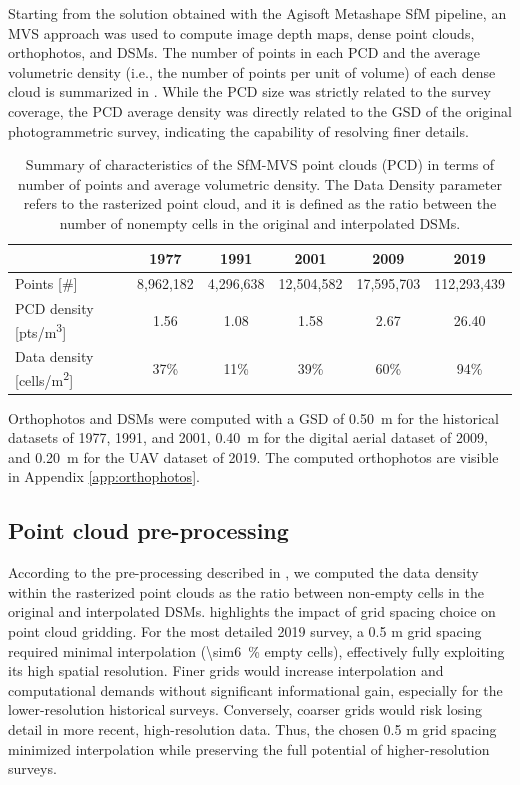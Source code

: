 Starting from the solution obtained with the Agisoft Metashape SfM pipeline, an MVS approach was used to compute image depth maps, dense point clouds, orthophotos, and DSMs. 
The number of points in each PCD and the average volumetric density (i.e., the number of points per unit of volume) of each dense cloud is summarized in .
While the PCD size was strictly related to the survey coverage, the PCD average density was directly related to the GSD of the original photogrammetric survey, indicating the capability of resolving finer details.

\begin{table}
    \centering
    \caption{Summary of characteristics of the SfM-MVS point clouds (PCD) in terms of number of points and average volumetric density. 
    The Data Density parameter refers to the rasterized point cloud, and it is defined as the ratio between the number of nonempty cells in the original and interpolated DSMs.}
    \label{tab:2:pcd_stats}
    \begin{tabular}{lccccc}
        \hline
        & 1977 & 1991 & 2001 & 2009 & 2019 \\
        \hline
        Points [\#] & 8,962,182 & 4,296,638 & 12,504,582 & 17,595,703 & 112,293,439 \\
        PCD density [pts/m\textsuperscript{3}] & 1.56 & 1.08 & 1.58 & 2.67 & 26.40 \\
        Data density [cells/m\textsuperscript{2}] & 37\% & 11\% & 39\% & 60\% & 94\% \\
        \hline
    \end{tabular}
\end{table}

Orthophotos and DSMs were computed with a GSD of \SI{0.50}{\meter} for the historical datasets of 1977, 1991, and 2001, \SI{0.40}{\meter} for the digital aerial dataset of 2009, and \SI{0.20}{\meter} for the UAV dataset of 2019.
The computed orthophotos are visible in Appendix \ref{app:orthophotos}.

\subsection{Point cloud pre-processing}\label{sec:2:res_preproc}

According to the pre-processing described in , we computed the data density within the rasterized point clouds as the ratio between non-empty cells in the original and interpolated DSMs.
 highlights the impact of grid spacing choice on point cloud gridding. 
For the most detailed 2019 survey, a 0.5 m grid spacing required minimal interpolation (\SI{\sim6}{\percent} empty cells), effectively fully exploiting its high spatial resolution. 
Finer grids would increase interpolation and computational demands without significant informational gain, especially for the lower-resolution historical surveys. 
Conversely, coarser grids would risk losing detail in more recent, high-resolution data. Thus, the chosen 0.5 m grid spacing minimized interpolation while preserving the full potential of higher-resolution surveys.

